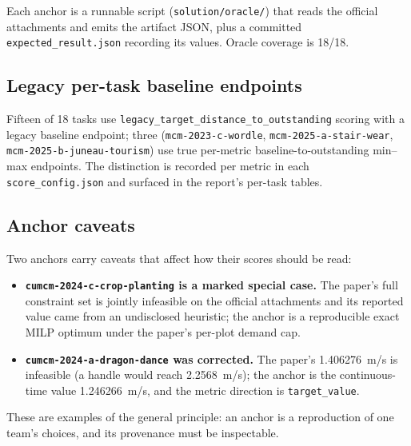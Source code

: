 Each anchor is a runnable script (\texttt{solution/oracle/}) that reads the
official attachments and emits the artifact JSON, plus a committed
\texttt{expected\_result.json} recording its values. Oracle coverage is 18/18.

\subsection{Legacy per-task baseline endpoints}
Fifteen of 18 tasks use \texttt{legacy\_target\_distance\_to\_outstanding}
scoring with a legacy baseline endpoint; three (\texttt{mcm-2023-c-wordle},
\texttt{mcm-2025-a-stair-wear}, \texttt{mcm-2025-b-juneau-tourism}) use true
per-metric baseline-to-outstanding min--max endpoints. The distinction is
recorded per metric in each \texttt{score\_config.json} and surfaced in the
report's per-task tables.

\subsection{Anchor caveats}
Two anchors carry caveats that affect how their scores should be read:
\begin{itemize}[leftmargin=1.4em,itemsep=1pt]
\item \textbf{\texttt{cumcm-2024-c-crop-planting} is a marked special case.} The
paper's full constraint set is jointly infeasible on the official attachments
and its reported value came from an undisclosed heuristic; the anchor is a
reproducible exact MILP optimum under the paper's per-plot demand cap.
\item \textbf{\texttt{cumcm-2024-a-dragon-dance} was corrected.} The paper's
1.406276~m/s is infeasible (a handle would reach 2.2568~m/s); the anchor is the
continuous-time value 1.246266~m/s, and the metric direction is
\texttt{target\_value}.
\end{itemize}
These are examples of the general principle: an anchor is a reproduction of one
team's choices, and its provenance must be inspectable.
